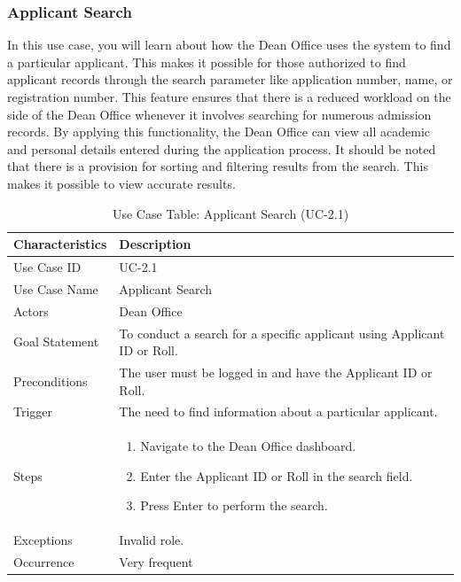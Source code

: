 \subsubsection{Applicant Search}


In this use case, you will learn about how the Dean Office uses the system to find a particular applicant. This makes it possible for those authorized to find applicant records through the search parameter like application number, name, or registration number. This feature ensures that there is a reduced workload on the side of the Dean Office whenever it involves searching for numerous admission records. By applying this functionality, the Dean Office can view all academic and personal details entered during the application process. It should be noted that there is a provision for sorting and filtering results from the search. This makes it possible to view accurate results.

\begin{table}[!htbp]
    \centering
    \small
    \renewcommand{\arraystretch}{1.5}
    \caption{Use Case Table: Applicant Search (UC-2.1)}
    \label{tab:dean_search}
    
    \begin{tabularx}{\textwidth}{|l|X|}
        \hline
        \rowcolor[gray]{0.9} {Characteristics} & {Description} \\ \hline
        Use Case ID & UC-2.1 \\ \hline
        Use Case Name & Applicant Search \\ \hline
        Actors & Dean Office \\ \hline
        Goal Statement & To conduct a search for a specific applicant using Applicant ID or Roll. \\ \hline
        Preconditions & The user must be logged in and have the Applicant ID or Roll. \\ \hline
        Trigger & The need to find information about a particular applicant. \\ \hline
        Steps &
        \begin{enumerate}[nosep, leftmargin=*]
        \item Navigate to the Dean Office dashboard.
        \item Enter the Applicant ID or Roll in the search field.
        \item Press Enter to perform the search.
        \end{enumerate} \\ \hline
        Exceptions & Invalid role. \\ \hline
        Occurrence & Very frequent \\ \hline
    \end{tabularx}
\end{table}
\FloatBarrier